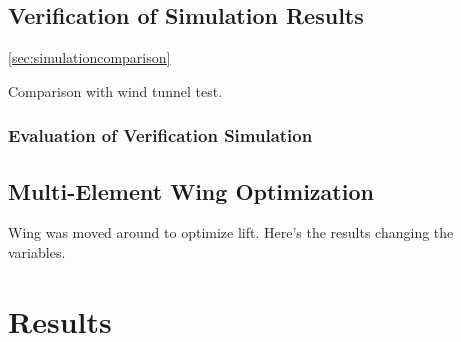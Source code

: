   \subsection{Verification of Simulation Results}
  \ref{sec:simulationcomparison}

  Comparison with wind tunnel test.

  \subsubsection{Evaluation of Verification Simulation}

  \subsection{Multi-Element Wing Optimization}
  Wing was moved around to optimize lift. Here's the results changing the variables.

\section{Results}
